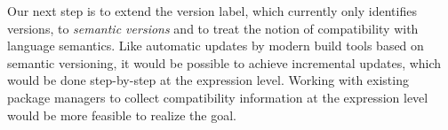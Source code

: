 Our next step is to extend the version label, which currently only identifies versions, to \emph{semantic versions} and to treat the notion of compatibility with language semantics.
Like automatic updates by modern build tools based on semantic versioning, it would be possible to achieve incremental updates, which would be done step-by-step at the expression level.
Working with existing package managers to collect compatibility information at the expression level would be more feasible to realize the goal.
